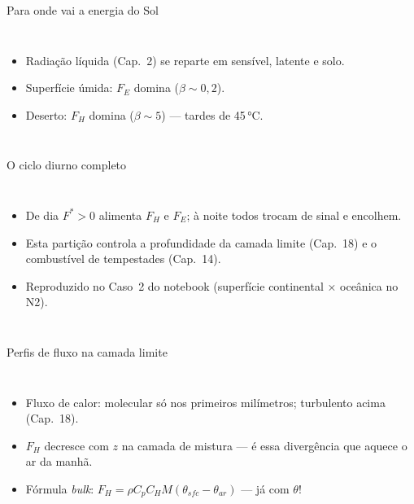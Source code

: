 \documentclass[aspectratio=169,11pt]{beamer}
\begin{document}
\begin{frame}{Para onde vai a energia do Sol}
  \begin{columns}
    \vspace{0.4em}
    \begin{itemize}
      \item Radiação líquida (Cap.~2) se reparte em sensível, latente e
            solo.
      \item Superfície úmida: $F_E$ domina ($\beta\sim0{,}2$).
      \item Deserto: $F_H$ domina ($\beta\sim5$) — tardes de 45\,°C.
    \end{itemize}
  \end{columns}
\end{frame}

\begin{frame}{O ciclo diurno completo}
  \begin{columns}
    \begin{itemize}
      \item De dia $F^*>0$ alimenta $F_H$ e $F_E$; à noite todos trocam
            de sinal e encolhem.
      \item Esta partição controla a profundidade da camada limite
            (Cap.~18) e o combustível de tempestades (Cap.~14).
      \item Reproduzido no Caso~2 do notebook (superfície continental ×
            oceânica no N2).
    \end{itemize}
  \end{columns}
\end{frame}

\begin{frame}{Perfis de fluxo na camada limite}
  \begin{columns}
    \begin{itemize}
      \item Fluxo de calor: molecular só nos primeiros milímetros;
            turbulento acima (Cap.~18).
      \item $F_H$ decresce com $z$ na camada de mistura — é essa
            divergência que aquece o ar da manhã.
      \item Fórmula \emph{bulk}: $F_H = \rho C_p C_H M
            (\theta_{sfc}-\theta_{ar})$ — já com $\theta$!
    \end{itemize}
  \end{columns}
\end{frame}
\end{document}
